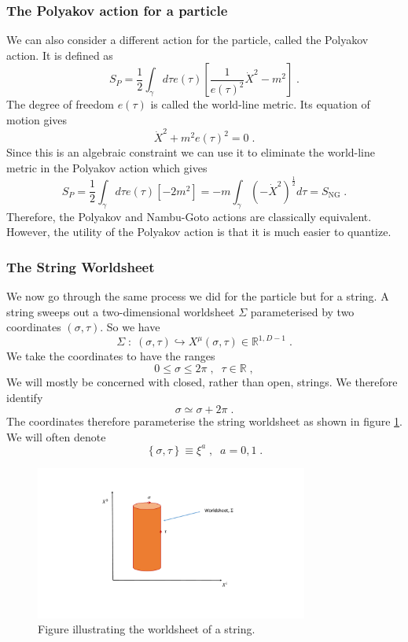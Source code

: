 \documentclass[11pt,a4paper]{article}
\numberwithin{equation}{section}
\numberwithin{table}{section}\setlength{\multlinegap}{25pt}
\newcommand{\be}{\begin{equation}}
\newcommand{\ee}{\end{equation}}
\begin{document}
\subsubsection{The Polyakov action for a particle}

We can also consider a different action for the particle, called the Polyakov action. It is defined as
\be
S_{P} = \frac12 \int_{\gamma} d \tau e\left(\tau\right) \left[ \frac{1}{e\left(\tau\right)^2} \dot X^2 - m^2 \right] \;.
\ee
The degree of freedom $e\left(\tau\right)$ is called the world-line metric. Its equation of motion gives 
\be
\dot X^2 + m^2 e\left(\tau\right)^2 = 0 \;.
\ee
Since this is an algebraic constraint we can use it to eliminate the world-line metric in the Polyakov action which gives
\be
S_P = \frac12 \int_{\gamma} d \tau e\left(\tau\right) \left[ -2m^2 \right] = - m  \int_{\gamma}\left(-\dot X^2 \right)^{\frac12} d\tau = S_{\mathrm{NG}} \;.
\ee
Therefore, the Polyakov and Nambu-Goto actions are classically equivalent. However, the utility of the Polyakov action is that it is much easier to quantize.

\subsubsection{The String Worldsheet}

We now go through the same process we did for the particle but for a string. A string sweeps out a two-dimensional worldsheet $\Sigma$ parameterised by two coordinates $\left(\sigma,\tau\right)$. So we have
\be
\Sigma \;:\; \left(\sigma,\tau\right) \hookrightarrow X^{\mu}\left(\sigma,\tau\right) \in \mathbb{R}^{1,D-1} \;.
\ee
We take the coordinates to have the ranges
\be
0 \leq \sigma \leq 2\pi \;,\;\; \tau \in \mathbb{R} \;,
\ee
We will mostly be concerned with closed, rather than open, strings. We therefore identify
\be
\sigma \simeq \sigma + 2 \pi \;.
\ee
The coordinates therefore parameterise the string worldsheet as shown in figure \ref{fig:sws}. We will often denote 
\be
\left\{ \sigma, \tau \right\} \equiv \xi^a \;,\;\; a=0,1 \;.
\ee
\begin{figure}[t]
\centering
 \includegraphics[width=0.8\textwidth]{Fig2.pdf}
\caption{Figure illustrating the worldsheet of a string.}
\label{fig:sws}
\end{figure}
\end{document}
